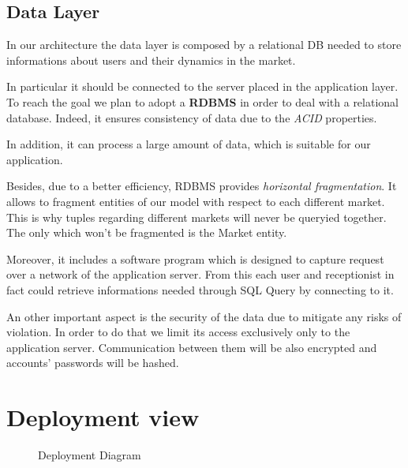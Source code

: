 \subsection{Data Layer}

In our architecture the data layer is composed by a relational DB needed to store informations about users and their dynamics in the market. 

In particular it should be connected to the server placed in the application layer. To reach the goal we plan to adopt a \textbf{RDBMS} in order to deal with a relational database. Indeed, it ensures consistency of data due to the \textit{ACID} properties.

In addition, it can process a large amount of data, which is suitable for our application. 

Besides, due to a better efficiency, RDBMS provides \textit{horizontal fragmentation}. It allows to fragment entities of our model with respect to each different market. This is why tuples regarding different markets will never be queryied together. The only which won't be fragmented is the Market entity. 

Moreover, it includes a software program which is designed to capture request over a network of the application server. From this each user and receptionist in fact could retrieve informations needed through SQL Query by connecting to it.  


An other important aspect is the security of the data due to mitigate any risks of violation. In order to do that we limit its access exclusively only to the application server. Communication between them will be also encrypted and accounts' passwords will be hashed.




\section{Deployment view}


\begin{figure}[H]
  \label{fig:deployment}
  \centering
    \caption{Deployment Diagram}
\end{figure}



